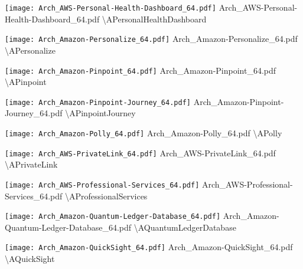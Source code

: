  {\texttt{[image: Arch\_AWS-Personal-Health-Dashboard\_64.pdf]}} {Arch\_AWS-Personal-Health-Dashboard\_64.pdf} {{\textbackslash}APersonalHealthDashboard}

 {\texttt{[image: Arch\_Amazon-Personalize\_64.pdf]}} {Arch\_Amazon-Personalize\_64.pdf} {{\textbackslash}APersonalize}

 {\texttt{[image: Arch\_Amazon-Pinpoint\_64.pdf]}} {Arch\_Amazon-Pinpoint\_64.pdf} {{\textbackslash}APinpoint}

 {\texttt{[image: Arch\_Amazon-Pinpoint-Journey\_64.pdf]}} {Arch\_Amazon-Pinpoint-Journey\_64.pdf} {{\textbackslash}APinpointJourney}

 {\texttt{[image: Arch\_Amazon-Polly\_64.pdf]}} {Arch\_Amazon-Polly\_64.pdf} {{\textbackslash}APolly}

 {\texttt{[image: Arch\_AWS-PrivateLink\_64.pdf]}} {Arch\_AWS-PrivateLink\_64.pdf} {{\textbackslash}APrivateLink}

 {\texttt{[image: Arch\_AWS-Professional-Services\_64.pdf]}} {Arch\_AWS-Professional-Services\_64.pdf} {{\textbackslash}AProfessionalServices}

 {\texttt{[image: Arch\_Amazon-Quantum-Ledger-Database\_64.pdf]}} {Arch\_Amazon-Quantum-Ledger-Database\_64.pdf} {{\textbackslash}AQuantumLedgerDatabase}

 {\texttt{[image: Arch\_Amazon-QuickSight\_64.pdf]}} {Arch\_Amazon-QuickSight\_64.pdf} {{\textbackslash}AQuickSight}


